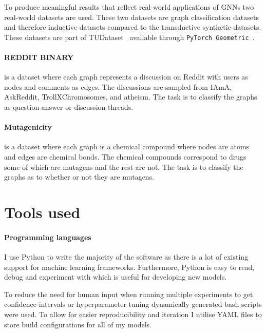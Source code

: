 To produce meaningful results that reflect real-world applications of GNNs two real-world datasets are used.
These two datasets are graph classification datasets and therefore inductive datasets compared to the transductive synthetic datasets.
These datasets are part of TUDataset~\cite{Morris+2020} available through \texttt{PyTorch Geometric}~\cite{Fey/Lenssen/2019}.

\paragraph{REDDIT BINARY}
is a dataset where each graph represents a discussion on Reddit with users as nodes and comments as edges.
The discussions are sampled from IAmA, AskReddit, TrollXChromosomes, and atheism.
The task is to classify the graphs as question-answer or discussion threads.

\paragraph{Mutagenicity}
is a dataset where each graph is a chemical compound where nodes are atoms and edges are chemical bonds.
The chemical compounds correspond to drugs some of which are mutagens and the rest are not.
The task is to classify the graphs as to whether or not they are mutagens.

\section{Tools used}


\paragraph{Programming languages}
I use Python to write the majority of the software as there is a lot of existing support for machine learning frameworks.
Furthermore, Python is easy to read, debug and experiment with which is useful for developing new models.

To reduce the need for human input when running multiple experiments to get confidence intervals or hyperparameter tuning dynamically generated bash scripts were used.
To allow for easier reproducibility and iteration I utilise YAML files to store build configurations for all of my models.


